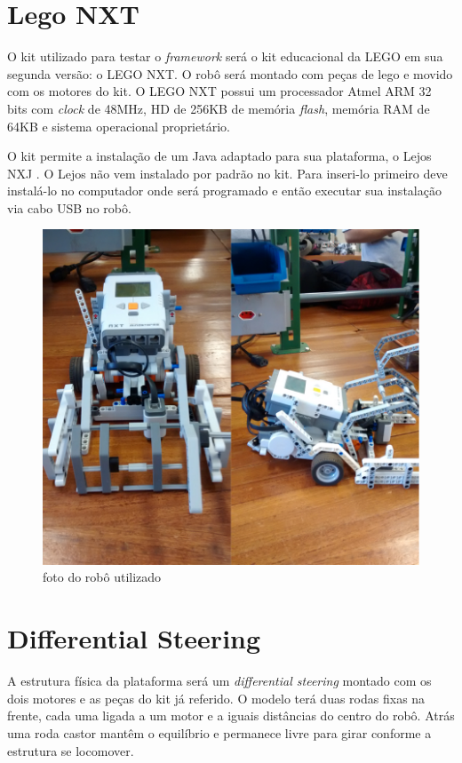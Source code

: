 \section{Lego NXT}

O kit utilizado para testar o \textit{framework} será o kit educacional da LEGO em sua segunda versão: o LEGO NXT. O robô será montado com peças de lego e movido com os motores do kit. O LEGO NXT possui um processador Atmel ARM 32 bits com \textit{clock} de 48MHz, HD de 256KB de memória \textit{flash}, memória RAM de 64KB e sistema operacional proprietário.

O kit permite a instalação de um Java adaptado para sua plataforma, o Lejos NXJ \cite{LEJOS_SITE}. O Lejos não vem instalado por padrão no kit. Para inseri-lo primeiro deve instalá-lo no computador onde será programado e então executar sua instalação via cabo USB no robô.

\begin{figure}[h]
	\centering
	\label{fig16}
		\includegraphics[keepaspectratio=true,scale=0.2]{figuras/5nxtBrick.png}
	\caption{foto do robô utilizado}
\end{figure}

\section{Differential Steering}

A estrutura física da plataforma será um \textit{differential steering} montado com os dois motores e as peças do kit já referido. O modelo terá duas rodas fixas na frente, cada uma ligada a um motor e a iguais distâncias do centro do robô. Atrás uma roda castor mantêm o equilíbrio e permanece livre para girar conforme a estrutura se locomover.

